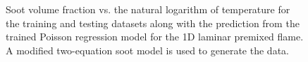 \documentclass[12pt]{CHT-20}
\begin{document}
\begin{figure}[!ht]
\begin{center}
\end{center}
\caption{Soot volume fraction vs. the natural logarithm of temperature for the training and testing datasets along with the prediction from the trained Poisson regression model for the 1D laminar premixed flame. A modified two-equation soot model is used to generate the data.}
\label{fig:1D_machLearning}
\end{figure}

\end{document}
